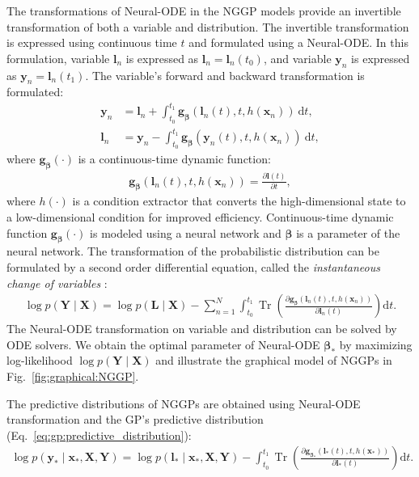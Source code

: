 \documentclass[sn-mathphys-num]{sn-jnl}
\begin{document}
The transformations of Neural-ODE in the NGGP models provide an invertible transformation of both a variable and distribution.
The invertible transformation is expressed using continuous time $t$ and formulated using a Neural-ODE.
In this formulation, variable $\mathbf l_n$ is expressed as $\mathbf l_n=\mathbf l_n(t_0)$, and variable $\mathbf y_n$ is expressed as $\mathbf y_n=\mathbf l_n(t_1)$.
The variable's forward and backward transformation is formulated:
\begin{align}
    \mathbf{y}_n &=  \mathbf{l}_n + \int_{t_0}^{t_1} \mathbf{g}_{\boldsymbol{\beta}}(\mathbf{l}_n(t),t,h({\mathbf x_n})) ~\mathrm{d} t, \label{eq:cnf:forward} \\
    \mathbf{l}_n &=  \mathbf{y}_n - \int_{t_0}^{t_1} \mathbf{g}_{\boldsymbol{\beta}}(\mathbf{y}_n(t),t,h({\mathbf x_n})) ~\mathrm{d} t, \label{eq:cnf:backward} 
\end{align}
where ${\mathbf g}_{\boldsymbol{\beta}}(\cdot)$ is a continuous-time dynamic function:
\begin{align}
    {\mathbf g}_{\boldsymbol{\beta}}(\mathbf{l}_n(t), t, h({\mathbf x_n})) = \frac{\partial \mathbf{l}(t)}{\partial t},
\end{align} 
where $h(\cdot)$ is a condition extractor that converts the high-dimensional state to a low-dimensional condition for improved efficiency. 
Continuous-time dynamic function ${\mathbf g}_{\boldsymbol{\beta}}(\cdot)$ is modeled using a neural network and $\boldsymbol\beta$ is a parameter of the neural network.
The transformation of the probabilistic distribution can be formulated by a second order differential equation, called the \textit{instantaneous change of variables} \cite{chen2018neural}:
\begin{align}\label{eq:icv}
    \log p(\mathbf{Y}\mid \mathbf X) = 
    \log p(\mathbf{L}\mid \mathbf X) -  \sum_{n=1}^N\int_{t_0}^{t_1}\operatorname{Tr}\left(\frac{\partial {\mathbf g}_{\boldsymbol{\beta}}(\mathbf{l}_n(t),t,h({\mathbf x}_n))}{\partial \mathbf{l}_n(t)}\right) \mathrm{d} t.
\end{align}
The Neural-ODE transformation on variable and distribution can be solved by ODE solvers.
We obtain the optimal parameter of Neural-ODE $\boldsymbol{\beta}_*$ by maximizing log-likelihood $\log p(\mathbf{Y}\mid \mathbf X)$ and illustrate the graphical model of NGGPs in Fig.~\ref{fig:graphical:NGGP}.

The predictive distributions of NGGPs are obtained using Neural-ODE transformation and the GP's predictive distribution (Eq.~\ref{eq:gp:predictive_distribution}):
\begin{align}\label{eq:nggp:model}
    \log p(\mathbf{y}_*\mid \mathbf x_*, \mathbf X, \mathbf Y) =
    \log p(\mathbf{l}_*\mid \mathbf x_*, \mathbf X, \mathbf Y) -  \int_{t_0}^{t_1}\operatorname{Tr}\left(\frac{\partial {\mathbf g}_{\boldsymbol{\beta}_*}(\mathbf{l}_*(t),t,h({\mathbf x}_*))}{\partial \mathbf{l}_*(t)}\right) \mathrm{d} t.
\end{align}
\end{document}
